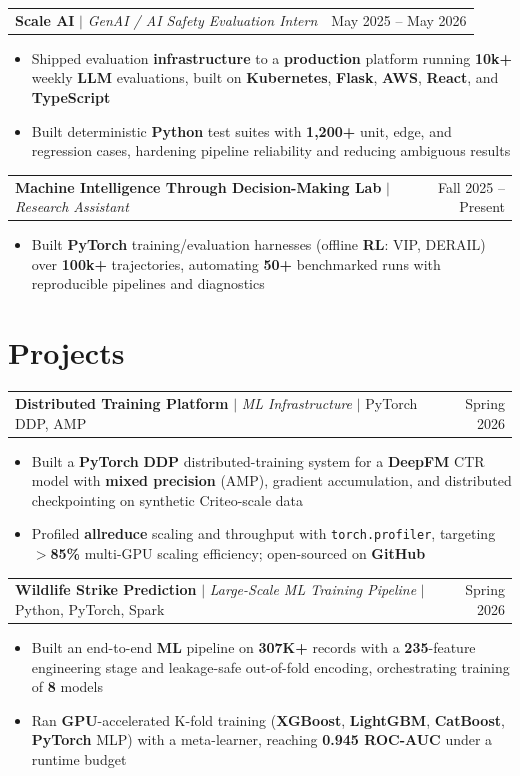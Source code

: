 \documentclass[letterpaper,10pt]{article}
\makeatletter
\newcommand{\resumeWorkHeading}[2]{%
  \vspace{2pt}\noindent
  \begin{tabular*}{\textwidth}{@{}l@{\extracolsep{\fill}}r@{}}
    #1 & #2 \\
  \end{tabular*}%
  \vspace{-2pt}
}
\newcommand{\resumeItemListStart}{\begin{itemize}}
\newcommand{\resumeItemListEnd}{\end{itemize}\vspace{3pt}}
\newcommand{\resumeItem}[1]{\item #1}
\makeatother
\begin{document}
\resumeWorkHeading
{\textbf{Scale AI} $|$ \emph{GenAI / AI Safety Evaluation Intern}}{May 2025 -- May 2026}
\resumeItemListStart
\resumeItem{Shipped evaluation \textbf{infrastructure} to a \textbf{production} platform running \textbf{10k+} weekly \textbf{LLM} evaluations, built on \textbf{Kubernetes}, \textbf{Flask}, \textbf{AWS}, \textbf{React}, and \textbf{TypeScript}}
\resumeItem{Built deterministic \textbf{Python} test suites with \textbf{1,200+} unit, edge, and regression cases, hardening pipeline reliability and reducing ambiguous results}
\resumeItemListEnd

\resumeWorkHeading
{\textbf{Machine Intelligence Through Decision-Making Lab} $|$ \emph{Research Assistant}}{Fall 2025 -- Present}
\resumeItemListStart
\resumeItem{Built \textbf{PyTorch} training/evaluation harnesses (offline \textbf{RL}: VIP, DERAIL) over \textbf{100k+} trajectories, automating \textbf{50+} benchmarked runs with reproducible pipelines and diagnostics}
\resumeItemListEnd

\section{Projects}
\resumeWorkHeading
{\textbf{Distributed Training Platform} $|$ \emph{ML Infrastructure} $|$ PyTorch DDP, AMP}{Spring 2026}
\resumeItemListStart
\resumeItem{Built a \textbf{PyTorch} \textbf{DDP} distributed-training system for a \textbf{DeepFM} CTR model with \textbf{mixed precision} (AMP), gradient accumulation, and distributed checkpointing on synthetic Criteo-scale data}
\resumeItem{Profiled \textbf{allreduce} scaling and throughput with \texttt{torch.profiler}, targeting \textbf{$>$85\%} multi-GPU scaling efficiency; open-sourced on \textbf{GitHub}}
\resumeItemListEnd

\resumeWorkHeading
{\textbf{Wildlife Strike Prediction} $|$ \emph{Large-Scale ML Training Pipeline} $|$ Python, PyTorch, Spark}{Spring 2026}
\resumeItemListStart
\resumeItem{Built an end-to-end \textbf{ML} pipeline on \textbf{307K+} records with a \textbf{235}-feature engineering stage and leakage-safe out-of-fold encoding, orchestrating training of \textbf{8} models}
\resumeItem{Ran \textbf{GPU}-accelerated K-fold training (\textbf{XGBoost}, \textbf{LightGBM}, \textbf{CatBoost}, \textbf{PyTorch} MLP) with a meta-learner, reaching \textbf{0.945 ROC-AUC} under a runtime budget}
\resumeItemListEnd
\end{document}
